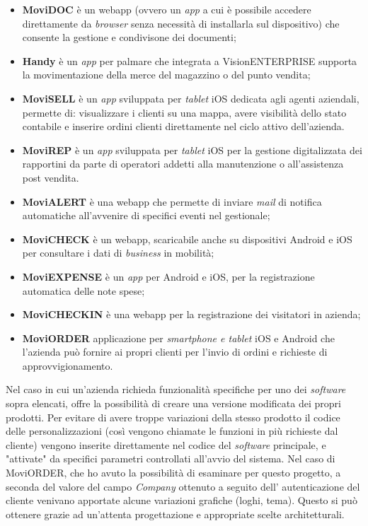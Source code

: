 \begin{itemize}
    \item \textbf{MoviDOC} è un \gls{webapp} (ovvero un \textit{app} a cui è possibile accedere direttamente da \textit{browser} senza 
          necessità di installarla sul dispositivo) che consente la gestione e condivisone dei documenti;
    \item \textbf{Handy} è un \textit{app} per palmare che integrata a VisionENTERPRISE supporta la movimentazione della merce del magazzino o del punto vendita;
    \item \textbf{MoviSELL} è un \textit{app} sviluppata per \textit{tablet} iOS dedicata agli agenti aziendali, permette di: visualizzare i 
          clienti su una mappa, avere visibilità dello stato contabile e inserire ordini clienti direttamente nel 
          ciclo attivo dell'azienda.
    \item \textbf{MoviREP} è un \textit{app} sviluppata per \textit{tablet} iOS per la gestione digitalizzata dei rapportini da parte di operatori addetti alla manutenzione o 
          all'assistenza post vendita. 
    \item \textbf{MoviALERT} è una \gls{webapp} che permette di inviare \textit{mail} di notifica automatiche all'avvenire di 
          specifici eventi nel gestionale;
    \item \textbf{MoviCHECK} è un \gls{webapp}, scaricabile anche su dispositivi Android e iOS per 
          consultare i dati di \textit{business} in mobilità;
    \item \textbf{MoviEXPENSE} è un \textit{app} per Android e iOS, per la registrazione automatica delle note 
          spese;
    \item \textbf{MoviCHECKIN} è una \gls{webapp} per la registrazione dei visitatori in azienda;
    \item \textbf{MoviORDER} applicazione per \textit{smartphone e tablet} iOS e Android che l’azienda può fornire ai propri clienti per l’invio di ordini e 
          richieste di approvvigionamento.
\end{itemize}

Nel caso in cui un'azienda richieda funzionalità specifiche per uno dei \textit{software} sopra elencati, {\company} offre la possibilità di creare una versione 
modificata dei propri prodotti. Per evitare di avere troppe variazioni della stesso prodotto il codice delle personalizzazioni (così vengono chiamate le funzioni in 
più richieste dal cliente) vengono inserite direttamente nel codice del \textit{software} principale, e "attivate" da specifici parametri controllati all'avvio del 
sistema. Nel caso di MoviORDER, che ho avuto la possibilità di esaminare per questo progetto, a seconda del valore del campo \textit{Company} ottenuto a seguito dell'
autenticazione del cliente venivano apportate alcune variazioni grafiche (loghi, tema). Questo si può ottenere grazie ad un'attenta progettazione e appropriate scelte 
architetturali.

 